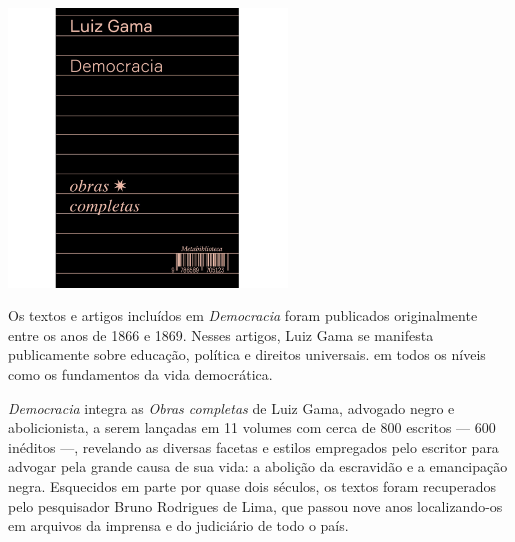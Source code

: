 \blankpage

\pagestyle{hedra}
\label{hedra}

\begin{center}
\hspace*{-3.6cm}
\hspace*{3.1cm}\includegraphics[width=74mm]{./CAPAS/HEDRA_DEMOCRACIA.jpg}
\end{center}
\hspace*{-7cm}\hrulefill\hspace*{-7cm}
\medskip

\noindent{}Os textos e artigos incluídos em \textit{Democracia} foram publicados originalmente entre os anos de 1866 e 1869. Nesses artigos, Luiz Gama se manifesta publicamente sobre educação, política e direitos universais.  em todos os níveis como os fundamentos da vida democrática.

\textit{Democracia} integra as \textit{Obras completas} de Luiz Gama, advogado negro e abolicionista, a serem lançadas em 11 volumes com cerca de 800 escritos --- 600 inéditos ---, revelando as diversas facetas e estilos empregados pelo escritor para advogar pela grande causa de sua vida: a abolição da escravidão e a emancipação negra. Esquecidos em parte por quase dois séculos, os textos foram recuperados pelo pesquisador Bruno Rodrigues de Lima, que passou nove anos localizando-os em arquivos da imprensa e do judiciário de todo o país.

